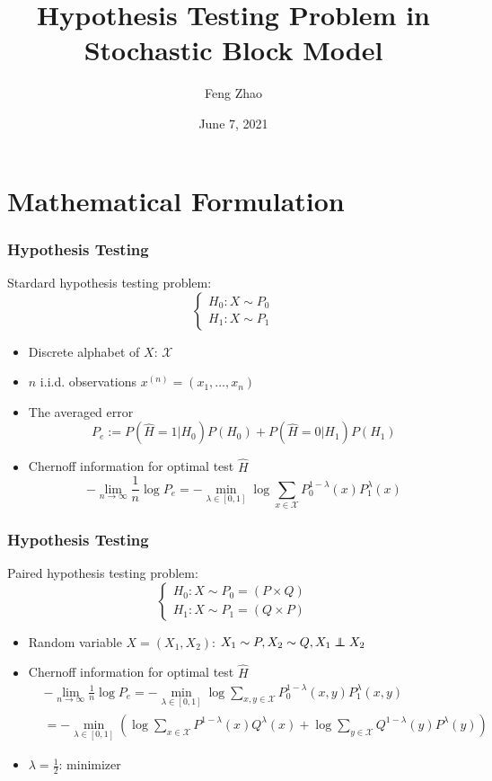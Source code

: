 \documentclass{beamer}
\title{Hypothesis Testing Problem in Stochastic Block Model}
\author{Feng Zhao}
\date{June 7, 2021}
\newcommand\independent{\protect\mathpalette{\protect\independenT}{\perp}}
\def\independenT#1#2{\mathrel{\rlap{$#1#2$}\mkern2mu{#1#2}}}
\begin{document}
\begin{frame}
	\titlepage
\end{frame}

\section{Mathematical Formulation}
\begin{frame}
\frametitle{Hypothesis Testing}
Stardard hypothesis testing problem:
\begin{equation*}
\begin{cases}
H_0: X \sim P_0 \\
H_1: X \sim P_1
\end{cases}
\end{equation*}
\begin{itemize}
\item Discrete alphabet of $X$: $\mathcal{X}$
\item $n$ i.i.d. observations $x^{(n)}=(x_1, \dots, x_n)$
\item The averaged error
$$
P_e := P(\widehat{H}=1|H_0)P(H_0) + P(\widehat{H}=0|H_1)P(H_1)
$$
\item Chernoff information for optimal test $\widehat{H}$
\begin{equation*}
-\lim_{n\to\infty} \frac{1}{n}\log P_e = -\min_{\lambda \in [0,1]}
\log \sum_{x\in \mathcal{X}}
P^{1-\lambda}_0(x) P^{\lambda}_1(x) 
\end{equation*}
\end{itemize}
\end{frame}
\begin{frame}\frametitle{Hypothesis Testing}
Paired hypothesis testing problem:
\begin{equation*}
\begin{cases}
H_0: X \sim P_0=(P \times Q)\\
H_1: X \sim P_1=(Q \times P)
\end{cases}
\end{equation*}
\begin{itemize}
\item Random variable $X=(X_1, X_2)$: $X_1 \sim P, X_2 \sim Q, X_1 \independent X_2$
\item Chernoff information for optimal test $\widehat{H}$
\begin{align*}
&-\lim_{n\to\infty} \frac{1}{n}\log P_e = -\min_{\lambda \in [0,1]}
\log \sum_{x,y\in \mathcal{X}}
P^{1-\lambda}_0(x,y) P^{\lambda}_1(x,y)  \\
&= -\min_{\lambda \in [0,1]}
\left(\log \sum_{x\in \mathcal{X}}
P^{1-\lambda}(x) Q^{\lambda}(x) 
+\log \sum_{y\in \mathcal{X}}
Q^{1-\lambda}(y) P^{\lambda}(y) 
\right)
\end{align*}
\item $\lambda=\frac{1}{2}$: minimizer
\end{itemize}
\end{frame}
\end{document}
